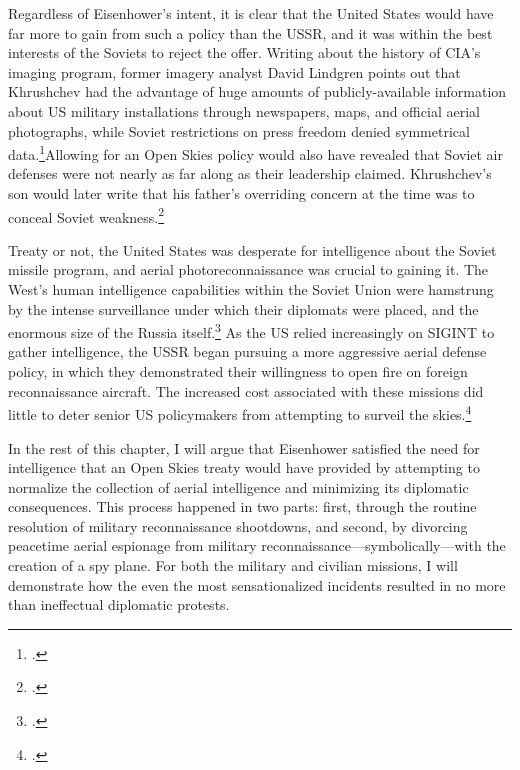 \documentclass[12pt]{article}
\begin{document}
Regardless of Eisenhower's intent, it is clear that the United States would have far more to gain from such a policy than the USSR, and it was within the best interests of the Soviets to reject the offer. Writing about the history of CIA's imaging program, former imagery analyst David Lindgren points out that Khrushchev had the advantage of huge amounts of publicly-available information about US military installations through newspapers, maps, and official aerial photographs, while Soviet restrictions on press freedom denied symmetrical data.\footcite[p.~38]{lindgren_trust_2000}Allowing for an Open Skies policy would also have revealed that Soviet air defenses were not nearly as far along as their leadership claimed. Khrushchev's son would later write that his father's overriding concern at the time was to conceal Soviet weakness.\footcite[p.~133]{brugioni_eyes_2010}

Treaty or not, the United States was desperate for intelligence about the Soviet missile program, and aerial photoreconnaissance was crucial to gaining it. The West's human intelligence capabilities within the Soviet Union were hamstrung by the intense surveillance under which their diplomats were placed, and the enormous size of the Russia itself.\footcite[p.~23]{lindgren_trust_2000} As the US relied increasingly on SIGINT to gather intelligence, the USSR began pursuing a more aggressive aerial defense policy, in which they demonstrated their willingness to open fire on foreign reconnaissance aircraft. The increased cost associated with these missions did little to deter senior US policymakers from attempting to surveil the skies.\footcite[p.~4]{pedlow_cia_1998}


In the rest of this chapter, I will argue that Eisenhower satisfied the need for intelligence that an Open Skies treaty would have provided by attempting to normalize the collection of aerial intelligence and minimizing its diplomatic consequences. This process happened in two parts: first, through the routine resolution of military reconnaissance shootdowns, and second, by divorcing peacetime aerial espionage from military reconnaissance---symbolically---with the creation of a spy plane. For both the military and civilian missions, I will demonstrate how the even the most sensationalized incidents resulted in no more than ineffectual diplomatic protests.
\end{document}
